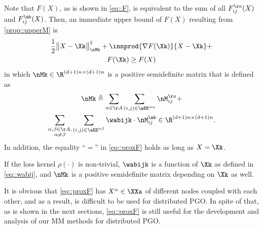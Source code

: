 Note that $F(X)$, as is shown in \cref{eq::F}, is equivalent to the sum of all $F_{ij}^{\aa}(X)$ and $F_{ij}^{\ab}(X)$. Then, an immediate upper bound of $F(X)$ resulting from \cref{prop::upperM} is
\vspace{-0.25em}
\begin{multline}\label{eq::proxF}
\frac{1}{2}\big\|X-\Xk\big\|_{\nMk}^2+\innprod{\nabla F(\Xk)}{X-\Xk}+\\
F(\Xk)\geq F(X)
\end{multline} 
in which $\nMk\in\R^{(d+1)n\times(d+1)n}$ is a positive semidefinite matrix that is defined as
\begin{multline}\label{eq::M}
\nMk\triangleq \sum_{\alpha\in\AA}\sum_{(i,j)\in \aEE^{\alpha\alpha}}\nM_{ij}^{\aa}+\\
\sum_{\substack{\alpha,\beta\in\AA,\\\alpha\neq \beta}}\sum_{(i,j)\in \aEE^{\alpha\beta}}\wabijk\cdot \nM_{ij}^{\ab}\in\R^{(d+1)n\times(d+1)n}.
\end{multline}
In addition, the equality ``$=$'' in \cref{eq::proxF} holds as long as $X=\Xk$. 

\begin{remark}
If the loss kernel  $\rho(\cdot)$ is non-trivial, $\wabijk$ is a function of $\Xk$ as defined in \cref{eq::wabij}, and $\nMk$ is a positive semidefinite matrix depending on $\Xk$ as well.
\end{remark}

It is obvious that \cref{eq::proxF} has $X^\alpha\in\XXa$ of different nodes coupled with each other, and as a result, is difficult to be used for distributed PGO. In spite of that, as is shown in the next sections, \cref{eq::proxF} is still useful for the development and analysis of our MM methods for distributed PGO.

